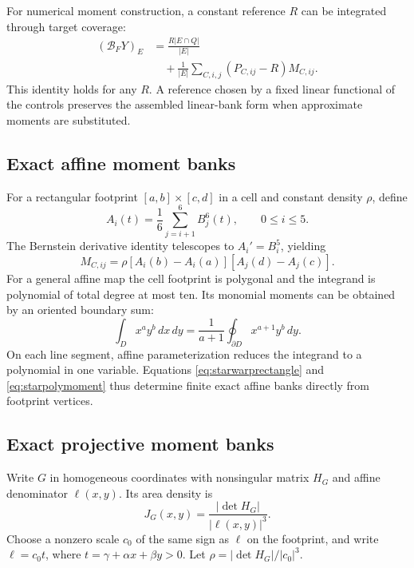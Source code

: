 For numerical moment construction, a constant reference $R$ can be integrated
through target coverage:
\begin{align}
 (\mathcal B_FY)_E
 &=\frac{R|E\cap Q|}{|E|}\nonumber\\
 &\quad+\frac1{|E|}\sum_{C,i,j}(P_{C,ij}-R)M_{C,ij}.
 \label{eq:starwarpfunctional}
\end{align}
This identity holds for any $R$. A reference chosen by a fixed linear
functional of the controls preserves the assembled linear-bank form when
approximate moments are substituted.

\subsection{Exact affine moment banks}
For a rectangular footprint $[a,b]\times[c,d]$ in a cell and constant density
$\rho$, define
\begin{equation}
 A_i(t)=\frac16\sum_{j=i+1}^6B_j^6(t),\qquad 0\leq i\leq5.
\end{equation}
The Bernstein derivative identity telescopes to $A_i'=B_i^5$, yielding
\begin{equation}
 M_{C,ij}=\rho[A_i(b)-A_i(a)][A_j(d)-A_j(c)].
 \label{eq:starwarprectangle}
\end{equation}
For a general affine map the cell footprint is polygonal and the integrand
is polynomial of total degree at most ten. Its monomial moments can be
obtained by an oriented boundary sum:
\begin{equation}
 \int_D x^ay^b\,dx\,dy
 =\frac1{a+1}\oint_{\partial D}x^{a+1}y^b\,dy.
 \label{eq:starpolymoment}
\end{equation}
On each line segment, affine parameterization reduces the integrand to a
polynomial in one variable. Equations \eqref{eq:starwarprectangle} and
\eqref{eq:starpolymoment} thus determine finite exact affine banks directly
from footprint vertices.

\subsection{Exact projective moment banks}
Write $G$ in homogeneous coordinates with nonsingular matrix $H_G$ and affine
denominator $\ell(x,y)$. Its area density is
\begin{equation}
 J_G(x,y)=\frac{|\det H_G|}{|\ell(x,y)|^3}.
\end{equation}
Choose a nonzero scale $c_0$ of the same sign as $\ell$ on the footprint,
and write $\ell=c_0t$, where $t=\gamma+\alpha x+\beta y>0$.
Let $\rho=|\det H_G|/|c_0|^3$.

